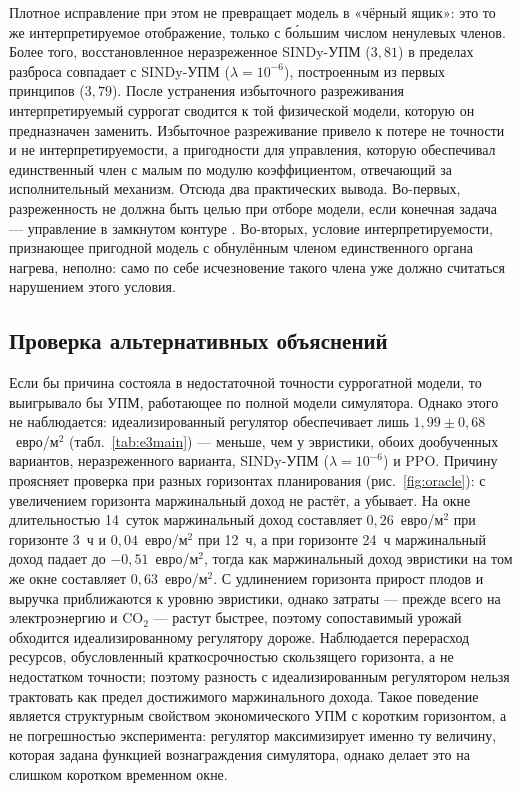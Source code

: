 \documentclass[12pt,a4paper,leqno]{article}
\begin{document}
Плотное исправление при этом не превращает модель в «чёрный ящик»: это то же интерпретируемое
отображение, только с бо́льшим числом ненулевых членов. Более того, восстановленное
неразреженное SINDy-УПМ ($3{,}81$) в пределах разброса совпадает с SINDy-УПМ ($\lambda=10^{-6}$),
построенным из первых принципов ($3{,}79$).%
После устранения
избыточного разреживания интерпретируемый суррогат сводится к той физической модели, которую
он предназначен заменить. Избыточное разреживание привело к потере не точности и не
интерпретируемости, а пригодности для управления, которую обеспечивал единственный член с малым по модулю
коэффициентом, отвечающий за исполнительный механизм. Отсюда два практических вывода.
Во-первых, разреженность не должна быть целью при отборе модели, если конечная задача —
управление в замкнутом контуре \cite{cortiella2021,balanceguided2026}. Во-вторых,
условие интерпретируемости, признающее пригодной модель с обнулённым членом единственного
органа нагрева, неполно: само по себе исчезновение такого члена уже должно считаться
нарушением этого условия.

\subsection{Проверка альтернативных объяснений}
\label{sec:rivals}
Если бы причина состояла в недостаточной точности суррогатной модели, то выигрывало бы
УПМ, работающее по полной модели симулятора. Однако этого не наблюдается: идеализированный
регулятор обеспечивает лишь $1{,}99\pm0{,}68$~евро/м$^2$ (табл.~\ref{tab:e3main}) — меньше, чем
у эвристики, обоих дообученных вариантов, неразреженного варианта, SINDy-УПМ ($\lambda=10^{-6}$) и PPO.
Причину проясняет проверка при разных горизонтах планирования (рис.~\ref{fig:oracle}):
с увеличением горизонта маржинальный доход не растёт, а убывает. На окне длительностью 14~суток
маржинальный доход составляет $0{,}26$~евро/м$^2$ при горизонте 3~ч и $0{,}04$~евро/м$^2$ при
12~ч, а при горизонте 24~ч маржинальный доход падает до $-0{,}51$~евро/м$^2$, тогда как маржинальный доход
эвристики на том же окне составляет $0{,}63$~евро/м$^2$. С удлинением горизонта прирост плодов и выручка
приближаются к уровню эвристики, однако затраты — прежде всего на электроэнергию и
CO$_2$ — растут быстрее, поэтому сопоставимый урожай обходится идеализированному
регулятору дороже. Наблюдается перерасход ресурсов, обусловленный краткосрочностью
скользящего горизонта, а не недостатком точности; поэтому разность с идеализированным
регулятором нельзя трактовать как предел достижимого маржинального дохода. Такое поведение является
структурным свойством экономического УПМ с коротким горизонтом, а не погрешностью
эксперимента: регулятор максимизирует именно ту величину, которая задана функцией
вознаграждения симулятора, однако делает это на слишком коротком временном окне.
\end{document}
